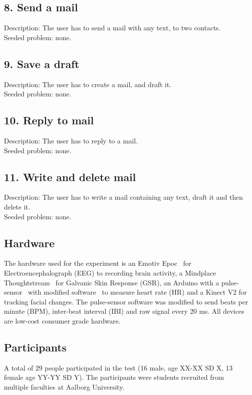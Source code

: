 \subsection*{8. Send a mail}
Description: The user has to send a mail with any text, to two contacts.\\
Seeded problem: none.
\subsection*{9. Save a draft}
Description: The user has to create a mail, and draft it.\\
Seeded problem: none.
\subsection*{10. Reply to mail}
Description: The user has to reply to a mail.\\
Seeded problem: none.
\subsection*{11. Write and delete mail}
Description: The user has to write a mail containing any text, draft it and then delete it.\\
Seeded problem: none.

\subsection{Hardware}
The hardware used for the experiment is an Emotiv Epoc~\cite{emotiv_epoc_website} for Electroencephalograph (EEG) to recording brain activity, a Mindplace Thoughtstream~\cite{thoughtstream} for Galvanic Skin Response (GSR), an Arduino with a pulse-sensor~\cite{pulsesensor} with modified software~\cite{pulsesensorgit} to measure heart rate (HR) and a Kinect V2\cite{kinect_specs3} for tracking facial changes.
The pulse-sensor software was modified to send beats per minute (BPM), inter-beat interval (IBI) and raw signal every 20 ms.
All devices are low-cost consumer grade hardware.

\subsection{Participants}
A total of 29 people participated in the test (16 male, age XX-XX SD X, 13 female age YY-YY SD Y).
The participants were students recruited from multiple faculties at Aalborg University.

